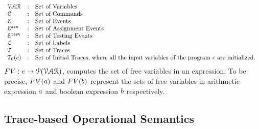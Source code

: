 \[
\begin{array}{lll}
\mathcal{VAR} & : & \mbox{Set of Variables}  
\\ 
%
\cdom & : & \mbox{Set of Commands} 
\\ 
%
\eventset  & : & \mbox{Set of Events}  
\\
%
\eventset^{\asn}  & : & \mbox{Set of Assignment Events}  
\\
%
\eventset^{\test}  & : & \mbox{Set of Testing Events}  
\\
%
\ldom  & : & \mbox{Set of Labels}  
\\
%
{\mathcal{T}} & : & \mbox{Set of Traces}
\\
%
\mathcal{T}_0(c) & : & \mbox{Set of Initial Traces, where all the input variables of the program $c$ are initialized.
}
\end{array}
\]
$FV: e \to \mathcal{P}(\mathcal{VAR})$, computes the set of free variables in an expression. To be precise,
$FV(a)$ and $FV(b)$
represent the sets of free variables in arithmetic
expression $a$ and boolean expression $b$
respectively.
%
\subsection{{Trace-based Operational Semantics}}
\label{sec:operational_semantics}
